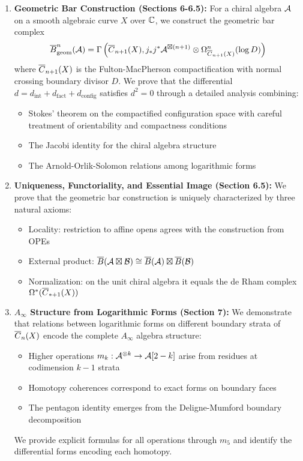 \begin{enumerate}
\item \textbf{Geometric Bar Construction (Sections 6-6.5):} For a chiral algebra $\mathcal{A}$ on a smooth algebraic curve $X$ over $\mathbb{C}$, we construct the geometric bar complex
\[
\overline{B}^n_{\text{geom}}(\mathcal{A}) = \Gamma\left(\overline{C}_{n+1}(X), j_*j^*\mathcal{A}^{\boxtimes(n+1)} \otimes \Omega^n_{\overline{C}_{n+1}(X)}(\log D)\right)
\]
where $\overline{C}_{n+1}(X)$ is the Fulton-MacPherson compactification with normal crossing boundary divisor $D$. We prove that the differential $d = d_{\text{int}} + d_{\text{fact}} + d_{\text{config}}$ satisfies $d^2 = 0$ through a detailed analysis combining:
\begin{itemize}
\item Stokes' theorem on the compactified configuration space with careful treatment of orientability and compactness conditions
\item The Jacobi identity for the chiral algebra structure
\item The Arnold-Orlik-Solomon relations among logarithmic forms
\end{itemize}
 
\item \textbf{Uniqueness, Functoriality, and Essential Image (Section 6.5):} We prove that the geometric bar construction is uniquely characterized by three natural axioms:
\begin{itemize}
\item Locality: restriction to affine opens agrees with the construction from OPEs
\item External product: $\overline{B}(\mathcal{A} \boxtimes \mathcal{B}) \cong \overline{B}(\mathcal{A}) \boxtimes \overline{B}(\mathcal{B})$  
\item Normalization: on the unit chiral algebra it equals the de Rham complex $\Omega^*(\overline{C}_{*+1}(X))$
\end{itemize}


\item \textbf{$A_\infty$ Structure from Logarithmic Forms (Section 7):} We demonstrate that relations between logarithmic forms on different boundary strata of $\overline{C}_n(X)$ encode the complete $A_\infty$ algebra structure:
\begin{itemize}
\item Higher operations $m_k : \mathcal{A}^{\otimes k} \to \mathcal{A}[2-k]$ arise from residues at codimension $k-1$ strata
\item Homotopy coherences correspond to exact forms on boundary faces  
\item The pentagon identity emerges from the Deligne-Mumford boundary decomposition
\end{itemize}
We provide explicit formulas for all operations through $m_5$ and identify the differential forms encoding each homotopy.
 

\end{enumerate}
